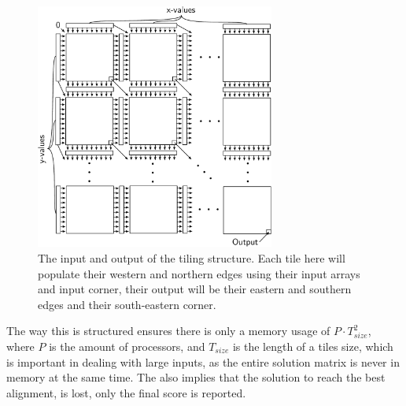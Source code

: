 \begin{figure}[H]
  \center
  \includegraphics[width=0.7\textwidth]{fig/fig1.pdf}
  \caption{The input and output of the tiling structure. Each tile here will populate their western and northern edges using their input arrays and input corner, their output will be their eastern and southern edges and their south-eastern corner.}
  \label{fig1}
\end{figure}
The way this is structured ensures there is only a memory usage of $P\cdot T_{size}^2$, where $P$ is the amount of processors, and $T_{size}$ is the length of a tiles size, which is important in dealing with large inputs, as the entire solution matrix is never in memory at the same time. The also implies that the solution to reach the best alignment, is lost, only the final score is reported.
